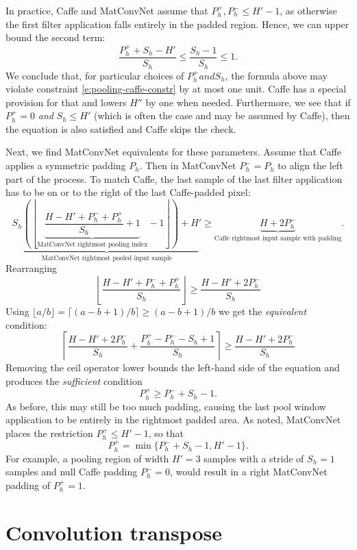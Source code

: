 In practice, Caffe and MatConvNet assume that $P_h^+, P_h^- \leq H' -1$, as otherwise the first filter application falls entirely in the padded region.  Hence, we can upper bound the second term:
\[
\frac{P^+_h + S_h - H'}{S_h}
\leq
\frac{S_h - 1}{S_h}
\leq
1.
\]
We conclude that, for particular choices of $P_h^+ and S_h$, the formula above may violate constraint \eqref{e:pooling-caffe-constr} by at most one unit. Caffe has a special provision for that and lowers $H''$ by one when needed. Furthermore, we see that if $P_h^+=0$ \emph{and} $S_h \leq H'$ (which is often the case and may be assumed by Caffe), then the equation is also satisfied and Caffe skips the check.

Next, we find MatConvNet equivalents for these parameters. Assume that Caffe applies a symmetric padding $P_h$. Then in MatConvNet $P_h^-=P_h$ to align the left part of the process. To match Caffe, the last sample of the last filter application has to be on or to the right of the last Caffe-padded pixel:
\[
\underbrace{
S_h
\left(
\left\lfloor
\underbrace
{
\frac{H - H' + P_h^- + P_h^+}{S_h}  + 1 
}_{\text{MatConvNet rightmost pooling index}}
- 1
\right\rfloor
\right)
+ H'
}_{\text{MatConvNet rightmost pooled input sample}}
\geq
\underbrace{
H + 2P_h^-
}_{\text{Caffe rightmost input sample with padding}}.
\]
Rearranging
\[
\left\lfloor
\frac{H - H' + P_h^- + P_h^+}{S_h}
\right\rfloor
\geq
\frac{H - H' + 2P_h^{-}}{S_h}
\]
Using $\lfloor a/b \rfloor = \lceil (a - b + 1)/b \rceil \geq (a - b + 1)/b$ we get the \emph{equivalent} condition:
\[
\left\lceil 
\frac{H - H' + 2P_h^-}{S_h} + \frac{P_h^+ - P_h^- - S_h + 1}{S_h}
\right\rceil
\geq
\frac{H - H' + 2P_h^-}{S_h} 
\]
Removing the ceil operator lower bounds the left-hand side of the equation and produces the \emph{sufficient} condition
\[
 P_h^+ \geq P_h^- + S_h - 1.
\]
As before, this may still be too much padding, causing the last pool window application to be entirely in the rightmost padded area. As noted, MatConvNet places the restriction $P_h^+ \leq H' -1$, so that
\[
  P_h^+ = \min\{ P_h^- + S_h - 1 , H' - 1\}.
\]
For example, a pooling region of width $H'=3$ samples with  a stride of $S_h=1$ samples and null Caffe padding $P_h^-=0$, would result in a right MatConvNet padding of $P_h^+ = 1$.

\section{Convolution transpose}\label{s:receptive-convolution-transpose}

